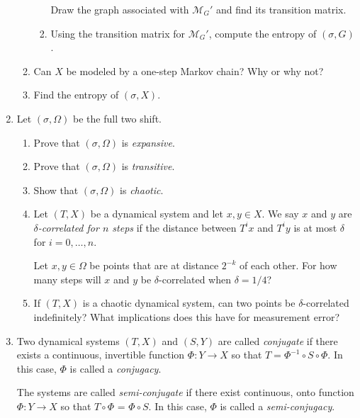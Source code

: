 \documentclass[letter]{article}
\begin{document}
\begin{enumerate}
\begin{enumerate}
\begin{enumerate}
					Draw the graph associated with $\mathcal M_G'$ and find its transition matrix.
				\item Using the transition matrix for $\mathcal M_G'$, compute the entropy of $(\sigma, G)$.
			\end{enumerate}
		\item Can $X$ be modeled by a one-step Markov chain? Why or why not?
		\item Find the entropy of $(\sigma, X)$.
			\end{enumerate}

		\item Let $(\sigma, \Omega)$ be the full two shift.
		\begin{enumerate}
			\item Prove that $(\sigma, \Omega)$ is \emph{expansive}.
			\item Prove that $(\sigma, \Omega)$ is \emph{transitive}.
			\item Show that $(\sigma, \Omega)$ is \emph{chaotic}.
			\item Let $(T,X)$ be a dynamical system and let $x,y\in X$. We say $x$ and $y$ are
				\emph{$\delta$-correlated for $n$ steps} if the distance between $T^ix$ and $T^iy$ is
				at most $\delta$ for $i=0,\ldots, n$.

				Let $x,y\in \Omega$ be points that are at distance $2^{-k}$ of each other. For how many steps will
				$x$ and $y$ be $\delta$-correlated when $\delta=1/4$?
			\item If $(T,X)$ is a chaotic dynamical system, can two points be $\delta$-correlated indefinitely? What implications
				does this have for measurement error?
		\end{enumerate}


	\item Two dynamical systems $(T, X)$ and $(S,Y)$ are called \emph{conjugate} if there exists a continuous, invertible
		function $\Phi:Y\to X$ so that $T=\Phi^{-1}\circ S\circ \Phi$. In this case, $\Phi$ is called a \emph{conjugacy}.

		The systems are called \emph{semi-conjugate} if there
			exist continuous, onto function $\Phi:Y\to X$ so that
			$T\circ\Phi$ = $\Phi\circ S$. In this case, $\Phi$ is called a \emph{semi-conjugacy}.



\end{enumerate}
\end{document}
